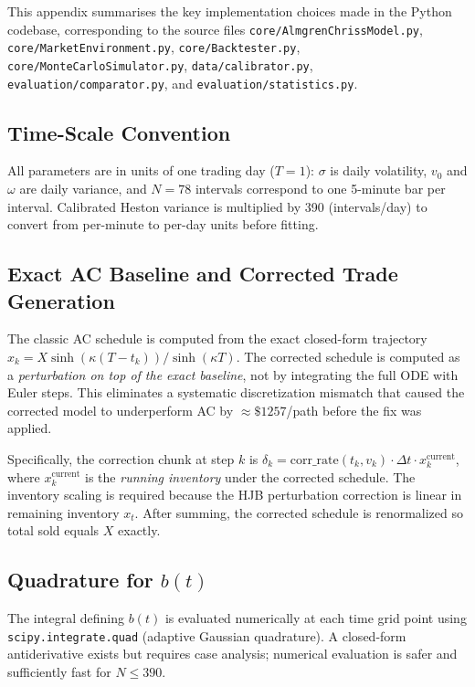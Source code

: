 \documentclass[11pt]{article}
\begin{document}
This appendix summarises the key implementation choices made in the Python codebase,
corresponding to the source files \texttt{core/AlmgrenChrissModel.py},
\texttt{core/MarketEnvironment.py}, \texttt{core/Backtester.py},
\texttt{core/MonteCarloSimulator.py}, \texttt{data/calibrator.py},
\texttt{evaluation/comparator.py}, and \texttt{evaluation/statistics.py}.

\subsection{Time-Scale Convention}

All parameters are in units of one trading day ($T=1$): $\sigma$ is daily volatility,
$v_0$ and $\omega$ are daily variance, and $N=78$ intervals correspond to one 5-minute
bar per interval. Calibrated Heston variance is multiplied by 390 (intervals/day) to
convert from per-minute to per-day units before fitting.

\subsection{Exact AC Baseline and Corrected Trade Generation}

The classic AC schedule is computed from the exact closed-form trajectory
$x_k = X\sinh(\kappa(T-t_k))/\sinh(\kappa T)$.
The corrected schedule is computed as a \emph{perturbation on top of the exact baseline},
not by integrating the full ODE with Euler steps. This eliminates a systematic discretization
mismatch that caused the corrected model to underperform AC by $\approx\$1257$/path before
the fix was applied.

Specifically, the correction chunk at step $k$ is
$\delta_k = \text{corr\_rate}(t_k,v_k)\cdot\Delta t\cdot x_k^{\text{current}}$,
where $x_k^{\text{current}}$ is the \emph{running inventory} under the corrected schedule.
The inventory scaling is required because the HJB perturbation correction is linear in
remaining inventory $x_t$.
After summing, the corrected schedule is renormalized so total sold equals $X$ exactly.

\subsection{Quadrature for $b(t)$}

The integral defining $b(t)$ is evaluated numerically at each time grid point using
\texttt{scipy.integrate.quad} (adaptive Gaussian quadrature). A closed-form antiderivative
exists but requires case analysis; numerical evaluation is safer and
sufficiently fast for $N\leq 390$.
\end{document}
